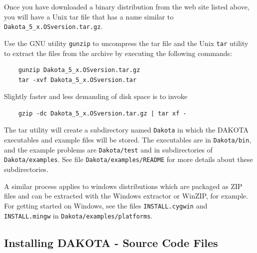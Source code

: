 Once you have downloaded a binary distribution from the web site
listed above, you will have a Unix tar file that has a name similar to
\texttt{Dakota\_5\_x.OSversion.tar.gz}.

Use the GNU utility \texttt{gunzip} to uncompress the tar file and
the Unix \texttt{tar} utility to extract the files from the archive by
executing the following commands:
\begin{small}
\begin{verbatim}
    gunzip Dakota_5_x.OSversion.tar.gz
    tar -xvf Dakota_5_x.OSversion.tar
\end{verbatim}
\end{small}
Slightly faster and less demanding of disk space is to invoke
\begin{small}
\begin{verbatim}
    gzip -dc Dakota_5_x.OSversion.tar.gz | tar xf -
\end{verbatim}
\end{small}

The tar utility will create a subdirectory named \texttt{Dakota} in
which the DAKOTA executables and example files will be stored. The
executables are in \texttt{Dakota/bin}, and the example problems are
\texttt{Dakota/test} and in subdirectories of \texttt{Dakota/examples}.
See file \texttt{Dakota/examples/README} for more details about these
subdirectories.

A similar process applies to windows distributions which are packaged
as ZIP files and can be extracted with the Windows extractor or
WinZIP, for example.  For getting started on Windows, see the
files \texttt{INSTALL.cygwin} and \texttt{INSTALL.mingw} in
\texttt{Dakota/examples/platforms}.

\subsection{Installing DAKOTA - Source Code Files}\label{tutorial:installation:installing2}

